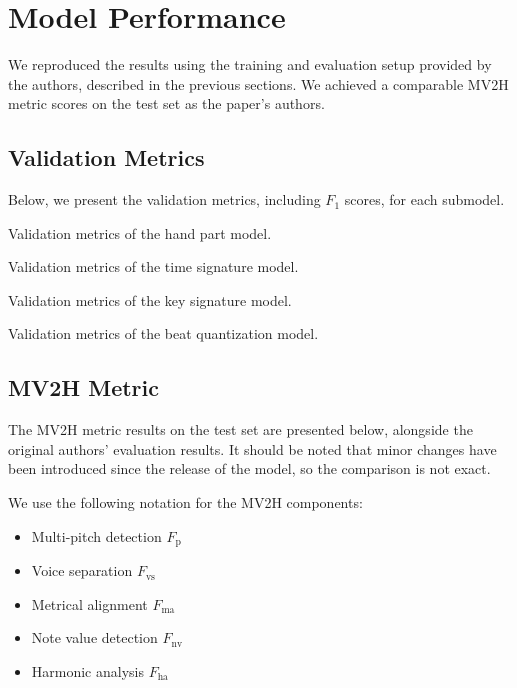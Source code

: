 \section{Model Performance}

We reproduced the results using the training and evaluation setup provided by the authors, described in the previous sections. We achieved a comparable MV2H metric scores on the test set as the paper's authors.

\subsection{Validation Metrics}

Below, we present the validation metrics, including $F_1$ scores, for each submodel.

\begin{table}[ht!]
\centering

\caption[Validation metrics of the hand part model.]{Validation metrics of the hand part model.}
\end{table}

\begin{table}[ht!]
\centering

\caption[Validation metrics of the time signature model.]{Validation metrics of the time signature model.}
\end{table}

\begin{table}[ht!]
\centering

\caption[Validation metrics of the key signature model.]{Validation metrics of the key signature model.}
\end{table}

\begin{table}[ht!]
\centering

\caption[Validation metrics of the beat quantization model.]{Validation metrics of the beat quantization model.}
\end{table}

\subsection{MV2H Metric}

The MV2H metric results on the test set are presented below, alongside the original authors' evaluation results. It should be noted that minor changes have been introduced since the release of the model, so the comparison is not exact.

We use the following notation for the MV2H components: \begin{itemize}
	\item Multi-pitch detection $F_{\textrm{p}}$
	\item Voice separation $F_{\textrm{vs}}$
	\item Metrical alignment $F_{\textrm{ma}}$
	\item Note value detection $F_{\textrm{nv}}$
	\item Harmonic analysis $F_{\textrm{ha}}$
\end{itemize}

